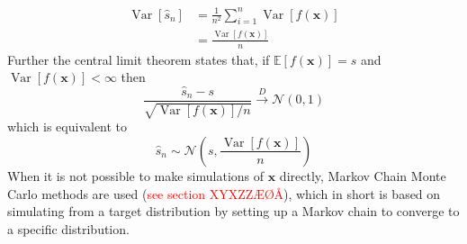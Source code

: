 \begin{equation*}
    \begin{split}
\operatorname{Var}\left[\hat{s}_{n}\right] &=\frac{1}{n^{2}} \sum_{i=1}^{n} \operatorname{Var}[f(\mathbf{x})] \\
&=\frac{\operatorname{Var}[f(\mathbf{x})]}{n}
\end{split}
\end{equation*}
Further the central limit theorem states that, if $\mathbb{E}[f(\mathbf{x})]=s$ and $\operatorname{Var}[f(\mathbf{x})]<\infty$ then
\begin{equation*}
    \frac{\hat{s}_{n}-s}{\sqrt{\operatorname{Var}[f(\mathbf{x})] / n}} \stackrel{D}{\rightarrow} \mathcal{N}(0,1)
\end{equation*}
which is equivalent to
\begin{equation*}
    \hat{s}_n\sim \mathcal{N}\left(s,\frac{\operatorname{Var}[f(\mathbf{x})]}{n}\right)
\end{equation*}
When it is not possible to make simulations of $\mathbf{x}$ directly, Markov Chain Monte Carlo methods are used (\textcolor{red}{see section XYXZZÆØÅ}), which in short is based on simulating from a target distribution by setting up a Markov chain to converge to a specific distribution.




